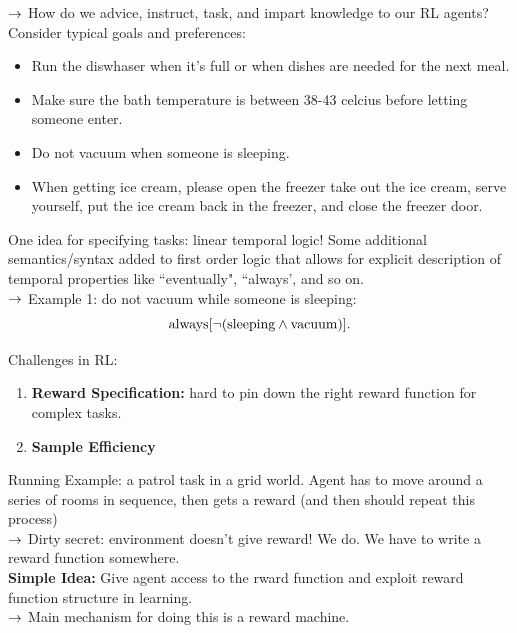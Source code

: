 
$\rightarrow$ How do we advice, instruct, task, and impart knowledge to our RL agents? \\

Consider typical goals and preferences:
\begin{itemize}
\item Run the diswhaser when it's full or when dishes are needed for the next meal.
\item Make sure the bath temperature is between 38-43 celcius before letting someone enter.
\item Do not vacuum when someone is sleeping.
\item When getting ice cream, please open the freezer take out the ice cream, serve yourself, put the ice cream back in the freezer, and close the freezer door.
\end{itemize}

One idea for specifying tasks: linear temporal logic! Some additional semantics/syntax added to first order logic that allows for explicit description of temporal properties like ``eventually", ``always', and so on. \\

$\rightarrow$ Example 1: do not vacuum while someone is sleeping:
\[
\text{always}[ \neg (\text{sleeping} \wedge \text{vacuum})].
\]

Challenges in RL:
\begin{enumerate}
\item {\bf Reward Specification:} hard to pin down the right reward function for complex tasks.
\item {\bf Sample Efficiency}
\end{enumerate}

Running Example: a patrol task in a grid world. Agent has to move around a series of rooms in sequence, then gets a reward (and then should repeat this process) \\

$\rightarrow$ Dirty secret: environment doesn't give reward! We do. We have to write a reward function somewhere. \\

{\bf Simple Idea:} Give agent access to the rward function and exploit reward function structure in learning. \\

$\rightarrow$ Main mechanism for doing this is a reward machine. \\

